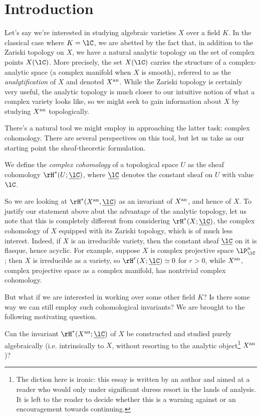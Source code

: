 \section{Introduction}
\label{intro}

Let's say we're interested in studying algebraic varieties $X$ over a field $K$. In the classical case where $K = \lC$, we are abetted by the fact that, in addition to the Zariski topology on $X$, we have a natural analytic topology on the set of complex points $X(\lC)$. More precisely, the set $X(\lC)$ carries the structure of a complex-analytic space (a complex manifold when $X$ is smooth), referred to as the \emph{analytification} of $X$ and denoted $X^{\mathrm{an}}$. While the Zariski topology is certainly very useful, the analytic topology is much closer to our intuitive notion of what a complex variety looks like, so we might seek to gain information about $X$ by studying $X^{\mathrm{an}}$ topologically.

There's a natural tool we might employ in approaching the latter task: complex cohomology. There are several perspectives on this tool, but let us take as our starting point the sheaf-theoretic formulation.

\begin{definition}
  \label{intro--complex-cohom}
  We define the \emph{complex cohomology} of a topological space $U$ as the sheaf cohomology $\rH^*(U;\u\lC)$, where $\u\lC$ denotes the constant sheaf on $U$ with value $\lC$.
\end{definition}

So we are looking at $\rH^*(X^\an,\u\lC)$ as an invariant of $X^{\mathrm{an}}$, and hence of $X$. To justify our statement above abut the advantage of the analytic topology, let us note that this is completely different from considering $\rH^*(X;\u\lC)$, the complex cohomology of $X$ equipped with its Zariski topology, which is of much less interest. Indeed, if $X$ is an irreducible variety, then the constant sheaf $\u\lC$ on it is flasque, hence acyclic. For example, suppose $X$ is complex projective space $\lP^n_\lC$; then $X$ is irreducible as a variety, so $\rH^r(X;\u\lC) \iso 0$ for $r > 0$, while $X^{\mathrm{an}}$, complex projective space as a complex manifold, has nontrivial complex cohomology.

But what if we are interested in working over some other field $K$? Is there some way we can still employ such cohomological invariants? We are brought to the following motivating question.

\begin{question}
  \label{intro--q-alg}
  Can the invariant $\rH^*(X^\an;\u\lC)$ of $X$ be constructed and studied purely algebraically (i.e. intrinsically to $X$, without resorting to the analytic object\footnote{The diction here is ironic: this essay is written by an author and aimed at a reader who would only under significant duress resort in the lands of analysis. It is left to the reader to decide whether this is a warning against or an encouragement towards continuing.} $X^{\mathrm{an}}$)?
\end{question}

